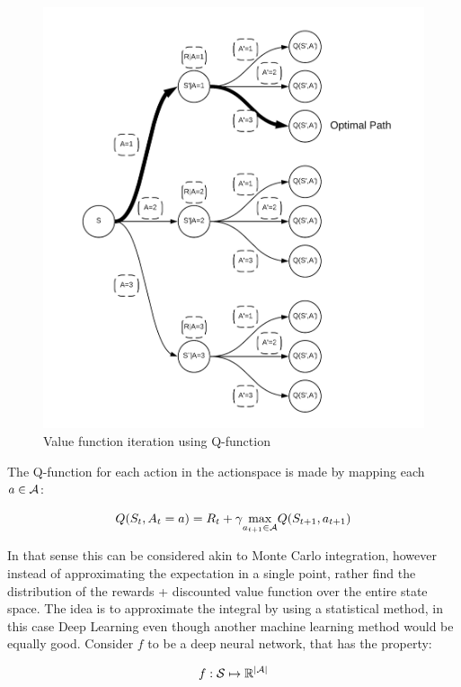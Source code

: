 \begin{figure}[ht]
    \centering
    \includegraphics[scale=0.15]{figures/vfi_figure.png}
    \caption{Value function iteration using Q-function}
    \label{fig:vfi_figure}
\end{figure}

The Q-function for each action in the actionspace is made by mapping each $a\in \mathcal{A}$:

\begin{equation}
 Q(S_t, A_t=a) = R_t + \gamma \underset{a_{t+1}\in \mathcal{A}}{\max} Q(S_{t+1}, a_{t+1})
\end{equation}

In that sense this can be considered akin to Monte Carlo integration, however instead of approximating the expectation in a single point, rather find the distribution of the rewards + discounted value function over the entire state space. The idea is to approximate the integral by using a statistical method, in this case Deep Learning even though another machine learning method would be equally good. Consider $f$ to be a deep neural network, that has the property:

\begin{equation}
    f: \mathcal{S} \mapsto\mathbb{R}^{\mid \mathcal{A} \mid}
\end{equation}

